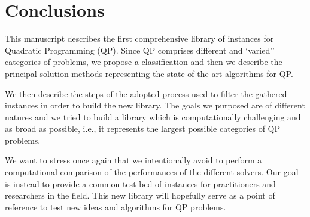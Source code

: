 \section{Conclusions}\label{sec:conclusions}

 This manuscript describes the first comprehensive library of instances for Quadratic Programming (QP). Since QP comprises  different and `varied'' categories of problems, we propose a classification and then we describe the principal solution methods representing the state-of-the-art algorithms for QP.

We then describe the steps of the adopted process used to filter the gathered instances  in order to build the new library. The goals we purposed are of different natures and we tried to build a library which is computationally challenging and as broad as possible, i.e., it represents the largest possible categories of QP problems. 

We want to stress once again that we intentionally avoid to perform a computational comparison of the performances of the different solvers. Our goal is instead to provide a common test-bed of instances for practitioners and researchers in the field. This new library will hopefully serve as a point of reference to test new ideas and algorithms for QP problems.

